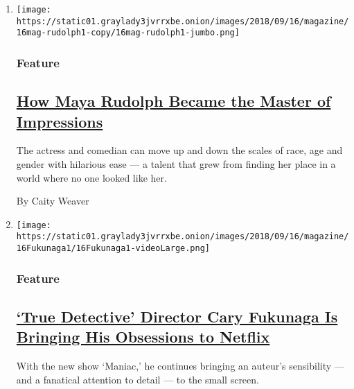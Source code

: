 \begin{enumerate}
\def\labelenumi{\arabic{enumi}.}
\item
  \texttt{[image: https://static01.graylady3jvrrxbe.onion/images/2018/09/16/magazine/16mag-rudolph1-copy/16mag-rudolph1-jumbo.png]}

  \hypertarget{feature}{%
  \subsubsection{Feature}\label{feature}}

  \hypertarget{how-maya-rudolph-became-the-master-of-impressions}{%
  \subsection{\texorpdfstring{\href{/2018/09/14/magazine/maya-rudolph-snl-amazon-forever.html}{How
  Maya Rudolph Became the Master of
  Impressions}}{How Maya Rudolph Became the Master of Impressions}}\label{how-maya-rudolph-became-the-master-of-impressions}}

  The actress and comedian can move up and down the scales of race, age
  and gender with hilarious ease --- a talent that grew from finding her
  place in a world where no one looked like her.

  By Caity Weaver
\item
  \texttt{[image: https://static01.graylady3jvrrxbe.onion/images/2018/09/16/magazine/16Fukunaga1/16Fukunaga1-videoLarge.png]}

  \hypertarget{feature-1}{%
  \subsubsection{Feature}\label{feature-1}}

  \hypertarget{true-detective-director-cary-fukunaga-is-bringing-his-obsessions-to-netflix}{%
  \subsection{\texorpdfstring{\href{/2018/09/11/magazine/true-detective-director-cary-fukunaga-netflix-maniac.html}{`True
  Detective' Director Cary Fukunaga Is Bringing His Obsessions to
  Netflix}}{`True Detective' Director Cary Fukunaga Is Bringing His Obsessions to Netflix}}\label{true-detective-director-cary-fukunaga-is-bringing-his-obsessions-to-netflix}}

  With the new show `Maniac,' he continues bringing an auteur's
  sensibility --- and a fanatical attention to detail --- to the small
  screen.


\end{enumerate}
